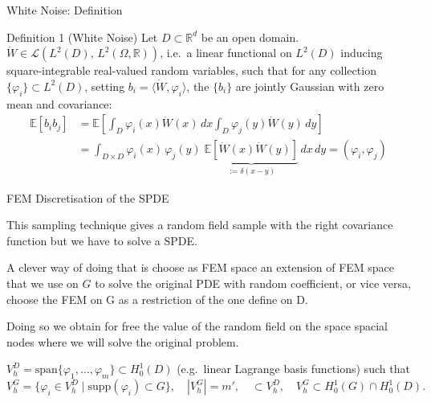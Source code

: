 \documentclass[
  english,            %
  aspectratio=169,    %
]{tumbeamer}
\begin{document}

\begin{frame}{White Noise: Definition}

\begin{block}{Definition 1 (White Noise)}
Let $D \subset \mathbb{R}^d$ be an open domain.
$\dot{W} \in \mathcal{L}(L^2(D),\,L^2(\Omega,\mathbb{R}))$, i.e.\ a linear functional on
$L^2(D)$ inducing square-integrable real-valued random variables, such that for any
collection $\{\varphi_i\} \subset L^2(D)$, setting $b_i = \langle\dot{W}, \varphi_i\rangle$,
the $\{b_i\}$ are jointly Gaussian with zero mean and covariance:
\begin{align}
  \mathbb{E}[b_i b_j]
  &= \mathbb{E}\!\left[\int_D \varphi_i(x)\dot{W}(x)\,dx
                       \int_D \varphi_j(y)\dot{W}(y)\,dy\right] \nonumber\\
  &= \int_{D\times D} \varphi_i(x)\,\varphi_j(y)\;
     \underbrace{\mathbb{E}[\dot{W}(x)\dot{W}(y)]}_{:= \delta(x-y)}
     \,dx\,dy
  = (\varphi_i,\varphi_j)
\end{align}
\end{block}

\end{frame}


\begin{frame}{FEM Discretisation of the SPDE}

This sampling technique gives a random field sample with the right covariance function but we have to solve a SPDE. 

\bigskip
A clever way of doing that is choose as FEM space an extension of FEM space 
that we use on $G$ to solve the original PDE with random coefficient, or vice versa, choose the FEM on G as a restriction of the one define on D.

\bigskip
Doing so we obtain for free the value of the random field on the space spacial nodes where we will solve the original problem.
\bigskip

$V_h^D = \mathrm{span}\{\varphi_1,\ldots,\varphi_m\} \subset H^1_0(D)$
(e.g.\ linear Lagrange basis functions) such that
\begin{equation}
  V_h^G = \{\varphi_i \in V_h^D \mid \mathrm{supp}(\varphi_i) \subset G\}, \quad |V_h^G| = m', \quad
  \subset V_h^D,\quad V_h^G \subset H_0^1(G) \cap H^1_0(D).
\end{equation}

\end{frame}
\end{document}
